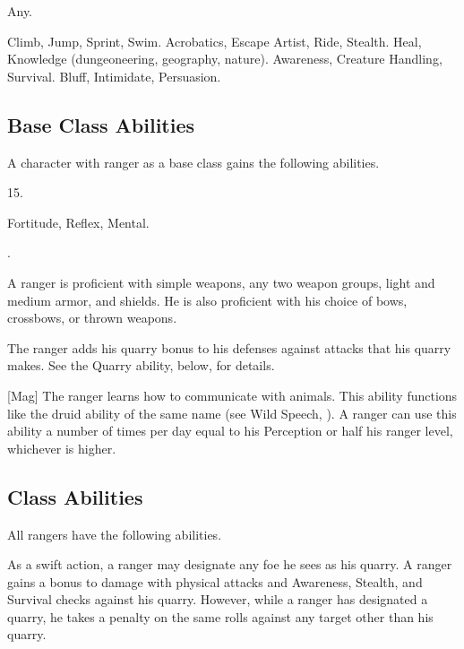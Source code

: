      Any.

     Climb, Jump, Sprint, Swim.
     Acrobatics, Escape Artist, Ride, Stealth.
     Heal, Knowledge (dungeoneering, geography, nature).
     Awareness, Creature Handling, Survival.
     Bluff, Intimidate, Persuasion.

    \subsection{Base Class Abilities}
        A character with ranger as a base class gains the following abilities.

         15.

          Fortitude,  Reflex,  Mental.

         .

        A ranger is proficient with simple weapons, any two weapon groups, light and medium armor, and shields.
        He is also proficient with his choice of bows, crossbows, or thrown weapons.

        The ranger adds his quarry bonus to his defenses against attacks that his quarry makes.
        See the Quarry ability, below, for details.

        [Mag]
        The ranger learns how to communicate with animals.
        This ability functions like the druid ability of the same name (see Wild Speech, ).
        A ranger can use this ability a number of times per day equal to his Perception or half his ranger level, whichever is higher.

    \subsection{Class Abilities}
        All rangers have the following abilities.

        As a swift action, a ranger may designate any foe he sees as his quarry.
        A ranger gains a  bonus to damage with physical attacks and Awareness, Stealth, and Survival checks against his quarry.
        However, while a ranger has designated a quarry, he takes a  penalty on the same rolls against any target other than his quarry.

